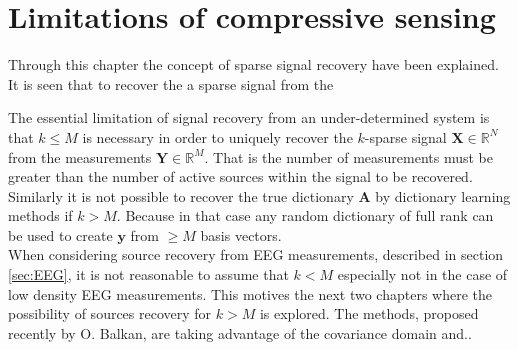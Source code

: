 \section{Limitations of compressive sensing}
Through this chapter the concept of sparse signal recovery have been explained. It is seen that to recover the a sparse signal from the  

The essential limitation of signal recovery from an under-determined system is that $k\leq M$ is necessary in order to uniquely recover the $k$-sparse signal $\textbf{X}\in \mathbb{R}^N$ from the measurements $\textbf{Y} \in \mathbb{R}^M$. That is the number of measurements must be greater than the number of active sources within the signal to be recovered.  
Similarly it is not possible to recover the true dictionary $\textbf{A}$ by dictionary learning methods if $k>M$. Because in that case any random dictionary of full rank can be used to create $\textbf{y}$ from $\geq M$ basis vectors\cite[p. 30]{phd2015}. \\
When considering source recovery from EEG measurements, described in section \ref{sec:EEG}, it is not reasonable to assume that $k<M$ especially not in the case of low density EEG measurements. This motives the next two chapters where the possibility of sources recovery for $k>M$ is explored. The methods, proposed recently by O. Balkan, are taking advantage of the covariance domain and..




